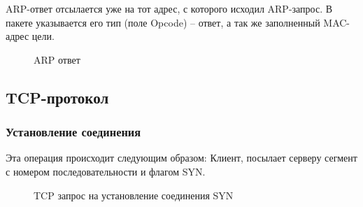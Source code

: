 \documentclass[a4paper, 14pt,russian]{article}
\begin{document}
ARP-ответ отсылается уже на тот адрес, с которого исходил ARP-запрос. В пакете указывается его тип (поле Opcode) – ответ, а так же заполненный MAC-адрес цели.
\begin{figure}[h!]
	\caption{ARP ответ}
	\label{img:arp_answ}
\end{figure}

\subsection{TCP-протокол}
	\subsubsection{Установление соединения}
		Эта операция происходит следующим образом: 
		Клиент, посылает серверу сегмент с номером последовательности и флагом SYN.
		\begin{figure}[h!]
			\caption{TCP запрос на установление соединения SYN}
			\label{img:tcp_syn}
		\end{figure}
		
\end{document}
